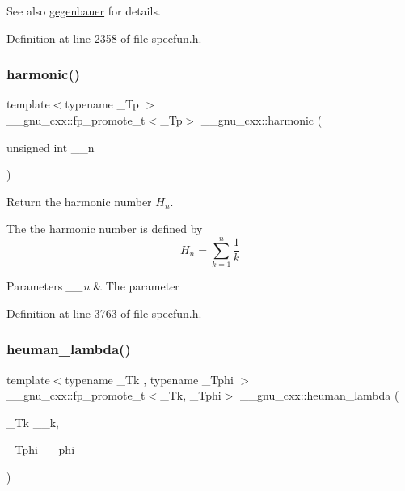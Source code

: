 \begin{DoxySeeAlso}{See also}
\hyperlink{group__gnu__math__spec__func_ga512e7981e328d6184f604de1892048b6}{gegenbauer} for details. 
\end{DoxySeeAlso}


Definition at line 2358 of file specfun.\+h.

\mbox{\label{group__gnu__math__spec__func_gab052b72af9c7ec030bcea81965390614}} 
\subsubsection{\texorpdfstring{harmonic()}{harmonic()}}
{\footnotesize\ttfamily template$<$typename \+\_\+\+Tp $>$ \\
\+\_\+\+\_\+gnu\+\_\+cxx\+::fp\+\_\+promote\+\_\+t$<$\+\_\+\+Tp$>$ \+\_\+\+\_\+gnu\+\_\+cxx\+::harmonic (\begin{DoxyParamCaption}\item[{unsigned int}]{\+\_\+\+\_\+n }\end{DoxyParamCaption})\hspace{0.3cm}{\ttfamily [inline]}}

Return the harmonic number $ H_n $.

The the harmonic number is defined by \[ H_n = \sum_{k=1}^{n}\frac{1}{k} \]


\begin{DoxyParams}{Parameters}
{\em \+\_\+\+\_\+n} & The parameter \\
\hline
\end{DoxyParams}


Definition at line 3763 of file specfun.\+h.

\mbox{\label{group__gnu__math__spec__func_ga7537f96eedc8571ed1987481b2863e89}} 
\subsubsection{\texorpdfstring{heuman\+\_\+lambda()}{heuman\_lambda()}}
{\footnotesize\ttfamily template$<$typename \+\_\+\+Tk , typename \+\_\+\+Tphi $>$ \\
\+\_\+\+\_\+gnu\+\_\+cxx\+::fp\+\_\+promote\+\_\+t$<$\+\_\+\+Tk, \+\_\+\+Tphi$>$ \+\_\+\+\_\+gnu\+\_\+cxx\+::heuman\+\_\+lambda (\begin{DoxyParamCaption}\item[{\+\_\+\+Tk}]{\+\_\+\+\_\+k,  }\item[{\+\_\+\+Tphi}]{\+\_\+\+\_\+phi }\end{DoxyParamCaption})\hspace{0.3cm}{\ttfamily [inline]}}

